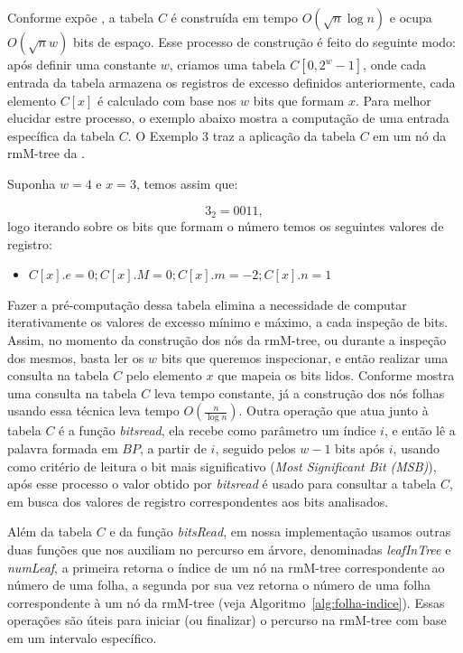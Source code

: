 Conforme expõe \citet{book-compact-data-structures}, a tabela $C$ é construída em tempo $O(\sqrt{n} \log n)$ e ocupa $O(\sqrt{n} w)$ bits de espaço. Esse processo de construção é feito do seguinte modo: após definir uma constante $w$, criamos uma tabela $C[0, 2^w-1]$,  onde cada entrada da tabela armazena os registros de excesso definidos anteriormente, cada elemento $C[x]$ é calculado com base nos $w$ bits  que formam $x$. Para melhor elucidar estre processo, o exemplo abaixo mostra a computação de uma entrada específica da tabela $C$. O Exemplo 3 traz a aplicação da tabela $C$ em um nó da rmM-tree da .
\begin{example}
    Suponha $w=4$ e $x=3$, temos assim que:

    $$3_2 = 0011,$$  logo iterando sobre os bits que formam o número temos os seguintes valores de  registro:
    \begin{itemize}
        \item $C[x].e = 0; C[x].M = 0; C[x].m = -2; C[x].n = 1$
    \end{itemize}
\end{example}

Fazer a pré-computação dessa tabela elimina a necessidade de computar iterativamente os valores de excesso mínimo e máximo, a cada inspeção de bits. Assim, no momento da construção dos nós da rmM-tree, ou durante a inspeção dos mesmos, basta ler os $w$ bits que queremos inspecionar, e então realizar uma consulta na tabela $C$ pelo elemento $x$ que mapeia os bits lidos. Conforme mostra \citet{book-compact-data-structures} uma consulta na tabela $C$ leva tempo constante, já a construção dos nós folhas usando essa técnica leva tempo $O(\frac{n}{\log n})$. Outra operação que atua junto à tabela $C$ é a função \textit{bitsread}, ela recebe como parâmetro um índice $i$, e então lê a palavra formada em $BP$, a partir de $i$, seguido pelos $w-1$ bits após $i$, usando como critério de leitura o bit mais significativo (\textit{Most Significant Bit (MSB)}), após esse processo o valor obtido por \textit{bitsread} é usado para consultar a tabela $C$, em busca dos valores de registro correspondentes aos bits analisados. 

Além da tabela $C$ e da função \textit{bitsRead}, em nossa implementação usamos outras duas funções que nos auxiliam no  percurso em árvore, denominadas \textit{leafInTree} e \textit{numLeaf}, a primeira retorna o índice de um nó na rmM-tree correspondente ao número de uma folha,  a segunda por sua vez retorna o número de uma folha correspondente à um nó da rmM-tree (veja Algoritmo~\ref{alg:folha-indice}). Essas operações são úteis para iniciar (ou finalizar) o percurso na rmM-tree com base em um intervalo específico.

